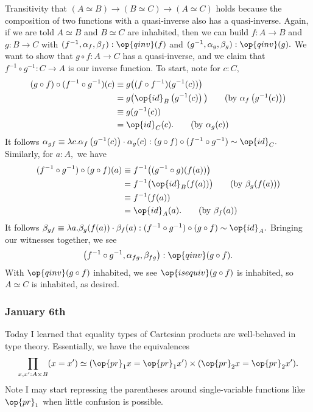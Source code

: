 Transitivity that $(A\simeq B)\to(B\simeq C)\to(A\simeq C)$ holds because the composition of two functions with a quasi-inverse also has a quasi-inverse. Again, if we are told $A\simeq B$ and $B\simeq C$ are inhabited, then we can build $f:A\to B$ and $g:B\to C$ with $(f^{-1},\alpha_f,\beta_f):\op{qinv}(f)$ and $(g^{-1},\alpha_g,\beta_g):\op{qinv}(g).$ We want to show that $g\circ f:A\to C$ has a quasi-inverse, and we claim that $f^{-1}\circ g^{-1}:C\to A$ is our inverse function. To start, note for $c:C,$
\begin{align*}
    (g\circ f)\circ(f^{-1}\circ g^{-1})(c) &\equiv g\big((f\circ f^{-1})(g^{-1}(c))\big) \\
    &= g\big(\op{id}_B\left(g^{-1}(c)\right)\big) \tag{by $\alpha_f\left(g^{-1}(c)\right)$} \\
    &\equiv g(g^{-1}(c)) \\
    &= \op{id}_C(c). \tag{by $\alpha_g(c)$}
\end{align*}
It follows $\alpha_{gf}\equiv\lambda c.\alpha_f\left(g^{-1}(c)\right)\cdot\alpha_g(c):(g\circ f)\circ(f^{-1}\circ g^{-1})\sim\op{id}_C.$ Similarly, for $a:A,$ we have
\begin{align*}
    (f^{-1}\circ g^{-1})\circ(g\circ f)(a) &\equiv f^{-1}\big((g^{-1}\circ g)(f(a))\big) \\
    &= f^{-1}\big(\op{id}_B(f(a))\big) \tag{by $\beta_g(f(a))$} \\
    &\equiv f^{-1}(f(a)) \\
    &= \op{id}_A(a). \tag{by $\beta_f(a)$}
\end{align*}
It follows $\beta_{gf}\equiv\lambda a.\beta_g(f(a))\cdot\beta_f(a):(f^{-1}\circ g^{-1})\circ(g\circ f)\sim\op{id}_A.$ Bringing our witnesses together, we see
\[\left(f^{-1}\circ g^{-1},\alpha_{fg},\beta_{fg}\right):\op{qinv}(g\circ f).\]
With $\op{qinv}(g\circ f)$ inhabited, we see $\op{isequiv}(g\circ f)$ is inhabited, so $A\simeq C$ is inhabited, as desired.

\subsubsection{January 6th}
Today I learned that equality types of Cartesian products are well-behaved in type theory. Essentially, we have the equivalences
\[\prod_{x,x':A\times B}(x=x')\simeq(\op{pr}_1x=\op{pr}_1x')\times(\op{pr}_2x=\op{pr}_2x').\]
Note I may start repressing the parentheses around single-variable functions like $\op{pr}_1$ when little confusion is possible.

